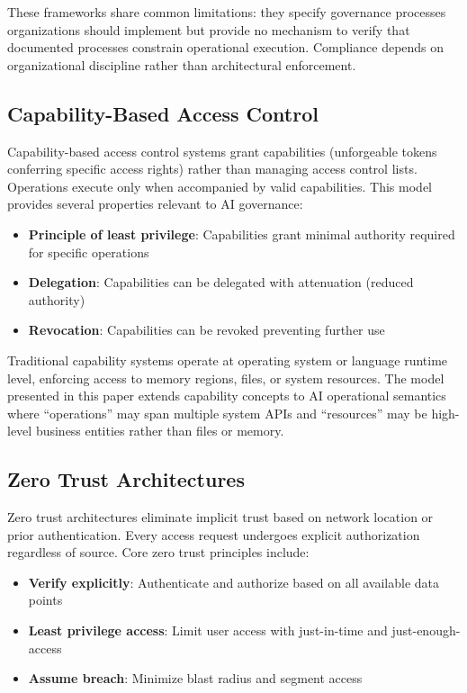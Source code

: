 \documentclass[11pt,letterpaper]{article}
\begin{document}
These frameworks share common limitations: they specify governance processes organizations should implement but provide no mechanism to verify that documented processes constrain operational execution. Compliance depends on organizational discipline rather than architectural enforcement.

\subsection{Capability-Based Access Control}

Capability-based access control systems \cite{dennis1966,miller2003} grant capabilities (unforgeable tokens conferring specific access rights) rather than managing access control lists. Operations execute only when accompanied by valid capabilities. This model provides several properties relevant to AI governance:

\begin{itemize}
\item \textbf{Principle of least privilege}: Capabilities grant minimal authority required for specific operations
\item \textbf{Delegation}: Capabilities can be delegated with attenuation (reduced authority)
\item \textbf{Revocation}: Capabilities can be revoked preventing further use
\end{itemize}

Traditional capability systems operate at operating system or language runtime level, enforcing access to memory regions, files, or system resources. The model presented in this paper extends capability concepts to AI operational semantics where ``operations'' may span multiple system APIs and ``resources'' may be high-level business entities rather than files or memory.

\subsection{Zero Trust Architectures}

Zero trust architectures \cite{rose2020} eliminate implicit trust based on network location or prior authentication. Every access request undergoes explicit authorization regardless of source. Core zero trust principles include:

\begin{itemize}
\item \textbf{Verify explicitly}: Authenticate and authorize based on all available data points
\item \textbf{Least privilege access}: Limit user access with just-in-time and just-enough-access
\item \textbf{Assume breach}: Minimize blast radius and segment access
\end{itemize}
\end{document}
